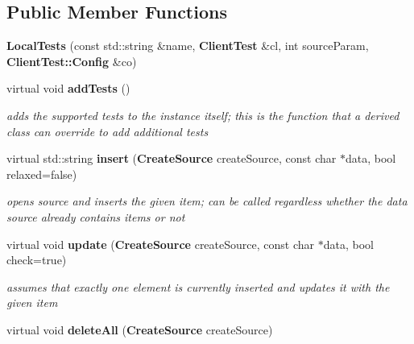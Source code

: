 \subsection*{Public Member Functions}
\begin{CompactItemize}
\item 
\textbf{Local\-Tests} (const std::string \&name, {\bf Client\-Test} \&cl, int source\-Param, {\bf Client\-Test::Config} \&co)\label{classLocalTests_d20120d9d597a0e81bdaf4651a7c04e7}

\item 
virtual void {\bf add\-Tests} ()\label{group__ClientTest_ga75ca0b749c031d14d99f11ad72fa3dd}

\begin{CompactList}\small\item\em adds the supported tests to the instance itself; this is the function that a derived class can override to add additional tests \item\end{CompactList}\item 
virtual std::string {\bf insert} ({\bf Create\-Source} create\-Source, const char $\ast$data, bool relaxed=false)
\begin{CompactList}\small\item\em opens source and inserts the given item; can be called regardless whether the data source already contains items or not \item\end{CompactList}\item 
virtual void {\bf update} ({\bf Create\-Source} create\-Source, const char $\ast$data, bool check=true)
\begin{CompactList}\small\item\em assumes that exactly one element is currently inserted and updates it with the given item \item\end{CompactList}\item 
virtual void {\bf delete\-All} ({\bf Create\-Source} create\-Source)\label{group__ClientTest_g85fef3b837faa5952472285c0f460faf}


\end{CompactItemize}
